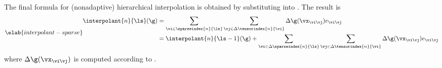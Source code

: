 The final formula for (nonadaptive) hierarchical interpolation is obtained by
substituting  into
. The result is
\begin{equation} \elab{interpolant-sparse}
  \begin{split}
    \interpolant{n}{\ls}(\g)
    &= \sum_{\vi \in \sparseindex{n}{\ls}} \sum_{\vj \in \Delta\tensorindex{n}{\vi}} \Delta\g(\vx_{\vi \vj}) e_{\vi \vj} \\
    &= \interpolant{n}{\ls - 1}(\g) + \sum_{\vi \in \Delta\sparseindex{n}{\ls}} \sum_{\vj \in \Delta\tensorindex{n}{\vi}} \Delta\g(\vx_{\vi \vj}) e_{\vi \vj}
  \end{split}
\end{equation}
where $\Delta\g(\vx_{\vi \vj})$ is computed according to
.
